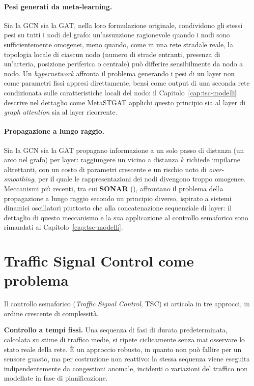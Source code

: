 \paragraph{Pesi generati da meta-learning.} Sia la GCN sia la GAT, nella
loro formulazione originale, condividono gli stessi pesi su
tutti i nodi del grafo: un'assunzione ragionevole quando i nodi sono
sufficientemente omogenei, meno quando, come in una rete stradale reale, la
topologia locale di ciascun nodo (numero di strade entranti, presenza di
un'arteria, posizione periferica o centrale) può differire sensibilmente da
nodo a nodo. Un \emph{hypernetwork} affronta il problema generando i pesi
di un layer non come parametri fissi appresi direttamente, bensì come
output di una seconda rete condizionata sulle caratteristiche locali del
nodo: il Capitolo~\ref{cap:tsc-modelli} descrive nel dettaglio come
MetaSTGAT applichi questo principio sia al layer di \emph{graph attention}
sia al layer ricorrente.

\paragraph{Propagazione a lungo raggio.} Sia la GCN sia la GAT propagano
informazione a un solo passo di distanza (un arco nel grafo) per layer:
raggiungere un vicino a distanza $k$ richiede impilarne altrettanti, con un
costo di parametri crescente e un rischio noto di \emph{over-smoothing}, per il quale le
rappresentazioni dei nodi divengono troppo omogenee. Meccanismi più recenti, tra cui \textbf{SONAR} (\citealp{trenta2025sonar}), affrontano il
problema della propagazione a lungo raggio secondo un principio diverso,
ispirato a sistemi dinamici oscillatori piuttosto che alla concatenazione sequenziale di
layer: il dettaglio di questo meccanismo e la sua
applicazione al controllo semaforico sono rimandati al Capitolo~\ref{cap:tsc-modelli}.

\section{Traffic Signal Control come problema}
\label{sec:background-tsc}

Il controllo semaforico (\emph{Traffic Signal Control}, TSC) si articola
in tre approcci, in ordine crescente di complessità.

\textbf{Controllo a tempi fissi.} Una sequenza di fasi di durata
predeterminata, calcolata su stime di traffico medie, si ripete
ciclicamente senza mai osservare lo stato reale della rete. È un approccio robusto, in quanto non
può fallire per un sensore guasto, ma per costruzione non reattivo: la
stessa sequenza viene eseguita indipendentemente da congestioni anomale, 
incidenti o variazioni del traffico non modellate in fase di pianificazione.

